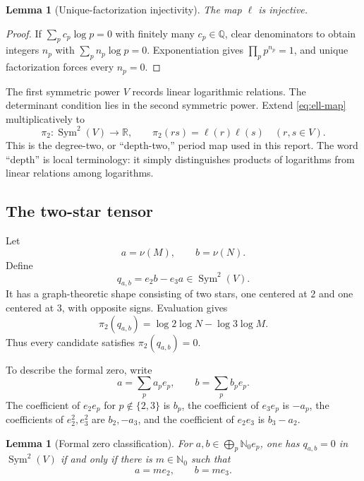 \documentclass[11pt]{article}
\newtheorem{lemma}[theorem]{Lemma}
\theoremstyle{definition}
\theoremstyle{remark}
\newcommand{\Q}{\mathbb{Q}}
\newcommand{\R}{\mathbb{R}}
\newcommand{\Nzero}{\mathbb{N}_{0}}
\newcommand{\Sym}{\operatorname{Sym}}
\newcommand{\ellmap}{\boldsymbol{\ell}}
\begin{document}
\begin{lemma}[Unique-factorization injectivity]
\label{lem:ell-injective}
The map $\ellmap$ is injective.
\end{lemma}

\begin{proof}
If $\sum_p c_p\log p=0$ with finitely many $c_p\in\Q$, clear denominators to obtain
integers $n_p$ with $\sum_p n_p\log p=0$.  Exponentiation gives
$\prod_p p^{n_p}=1$, and unique factorization forces every $n_p=0$.
\end{proof}

The first symmetric power $V$ records linear logarithmic relations.  The determinant
condition lies in the second symmetric power.  Extend \eqref{eq:ell-map} multiplicatively to
\begin{equation}
 \pi_2:\Sym^2(V)\longrightarrow\R,
 \qquad
 \pi_2(rs)=\ellmap(r)\ellmap(s)
 \quad(r,s\in V).
 \label{eq:pi2}
\end{equation}
This is the degree-two, or ``depth-two,'' period map used in this report.  The word
``depth'' is local terminology: it simply distinguishes products of logarithms from linear
relations among logarithms.

\subsection{The two-star tensor}

Let
\[
 a=\nu(M),\qquad b=\nu(N).
\]
Define
\begin{equation}
 q_{a,b}=e_2b-e_3a\in\Sym^2(V).
 \label{eq:two-star}
\end{equation}
It has a graph-theoretic shape consisting of two stars, one centered at $2$ and one centered
at $3$, with opposite signs.  Evaluation gives
\begin{equation}
 \pi_2(q_{a,b})
 =\log2\log N-\log3\log M.
 \label{eq:two-star-eval}
\end{equation}
Thus every candidate satisfies $\pi_2(q_{a,b})=0$.

To describe the formal zero, write
\[
 a=\sum_p a_pe_p,
 \qquad
 b=\sum_p b_pe_p.
\]
The coefficient of $e_2e_p$ for $p\notin\{2,3\}$ is $b_p$, the coefficient of
$e_3e_p$ is $-a_p$, the coefficients of $e_2^2,e_3^2$ are $b_2,-a_3$, and the coefficient
of $e_2e_3$ is $b_3-a_2$.

\begin{lemma}[Formal zero classification]
\label{lem:formal-zero}
For $a,b\in\bigoplus_p\Nzero e_p$, one has $q_{a,b}=0$ in $\Sym^2(V)$ if and only if
there is $m\in\Nzero$ such that
\[
 a=me_2,
 \qquad
 b=me_3.
\]
\end{lemma}
\end{document}
